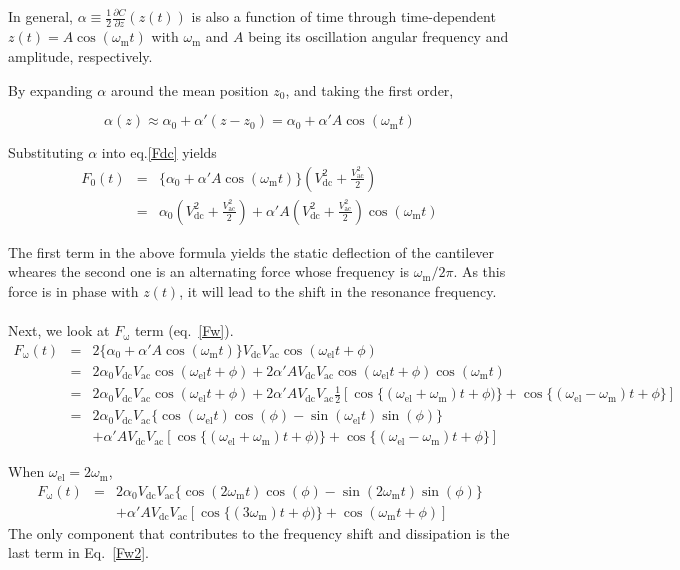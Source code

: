 \documentclass[preprint]{revtex4-1}
\newcommand{\dcdz}{\frac{\partial C}{\partial z}}
\newcommand{\Vdc}{V_\mathrm{dc}}
\newcommand{\Vac}{V_\mathrm{ac}}
\newcommand{\Fdc}{F_\mathrm{0}}
\newcommand{\Fw}{F_\mathrm{\omega}}
\newcommand{\wm}{\omega_\mathrm{m}}
\newcommand{\wel}{\omega_\mathrm{el}}
\begin{document}
In general, $\alpha \equiv \frac{1}{2}\dcdz(z(t))$ is 
also a function of time through time-dependent $z(t)=A\cos(\wm t)$
with $\wm$ and $A$ being its oscillation angular frequency and amplitude,
respectively.

By expanding $\alpha$ around the mean position $z_0$,
and taking the first order,

\begin{equation}
  \alpha (z) \approx \alpha_0 + \alpha ' (z-z_0) = \alpha_0 + \alpha ' A \cos(\wm t)
\end{equation}


Substituting $\alpha$ into eq.\ref{Fdc} yields 
\begin{eqnarray}
       \Fdc(t)  &= & \{\alpha_0 + \alpha' A \cos(\wm t)\} \left(\Vdc ^2 + \frac{\Vac^2}{2}\right) \nonumber \\
       &=& \alpha_0 \left(\Vdc ^2 + \frac{\Vac^2}{2}\right)  
       + \alpha' A\left(\Vdc ^2 + \frac{\Vac^2}{2}\right) \cos (\wm t)
      \label{Fdc2} 
\end{eqnarray}

The first term in the above formula yields the static deflection of the cantilever 
wheares the second one is an alternating force whose frequency is $\wm/2\pi$.
As this force is in phase with $z(t)$, it will lead to the shift in the resonance frequency.
\\\\
Next, we look at $\Fw$ term (eq.~\ref{Fw}).
\begin{eqnarray*}
       \Fw(t) &= & 2 \{\alpha_0 + \alpha' A \cos(\wm t)\} \Vdc\Vac \cos (\wel t + \phi) \\
       & = & 2\alpha_0 \Vdc\Vac \cos(\wel t + \phi) 
       + 2\alpha' A\Vdc\Vac \cos(\wel t + \phi) \cos(\wm t) \nonumber \\
       & = & 2\alpha_0 \Vdc\Vac \cos(\wel t + \phi) 
       + 2\alpha' A\Vdc\Vac \frac{1}{2}[\cos\{(\wel + \wm) t + \phi)\} + \cos\{(\wel - \wm)t +\phi\}] \nonumber \\
       & = & 2\alpha_0 \Vdc\Vac \{\cos(\wel t)\cos(\phi)- \sin(\wel t)\sin(\phi) \} \nonumber \\
       & & + \alpha' A\Vdc\Vac [\cos\{(\wel + \wm) t + \phi)\} + \cos\{(\wel - \wm)t +\phi\}]       \label{Fw2} 
\end{eqnarray*}

When $\wel =2 \wm$, 
\begin{eqnarray}
       \Fw(t) 
       & = & 2\alpha_0 \Vdc\Vac \{\cos(2\wm t)\cos(\phi)- \sin(2\wm t)\sin(\phi) \} \nonumber \\
       & & + \alpha' A\Vdc\Vac [\cos\{(3\wm) t + \phi)\} + \cos(\wm t +\phi)]       \label{Fw2} 
\end{eqnarray}
The only component that contributes to the frequency shift and dissipation is the last term
in Eq.~\ref{Fw2}.
\end{document}
